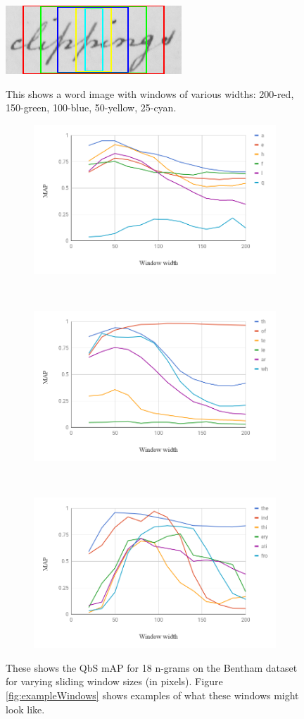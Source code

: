 \documentclass[ms,electronic,twosidetoc,letterpaper,chaptercenter,parttop,lof,lot]{byumsphd}
\begin{document}
\begin{figure}
    \centering
    \includegraphics[width=.33\textwidth]{exampleWindows}
    \caption{This shows a word image with windows of various widths: 200-red, 150-green, 100-blue, 50-yellow, 25-cyan.
    }
    \label{fig:exampleWindows}

    \centering
    \begin{subfigure}{.99\textwidth}
  \centering
  \includegraphics[width=.6\linewidth]{windowsizes1}
\end{subfigure}
\\
\begin{subfigure}{.99\textwidth}
  \centering
  \includegraphics[width=.6\linewidth]{windowsizes2}
\end{subfigure}
\\
\begin{subfigure}{.99\textwidth}
  \centering
  \includegraphics[width=.6\linewidth]{windowsizes3}
\end{subfigure}
    \caption{These shows the QbS mAP for 18 n-grams on the Bentham dataset for varying sliding window sizes (in pixels). Figure \ref{fig:exampleWindows} shows examples of what these windows might look like.
    }
    \label{fig:windowsizes}
\end{figure}
\end{document}
